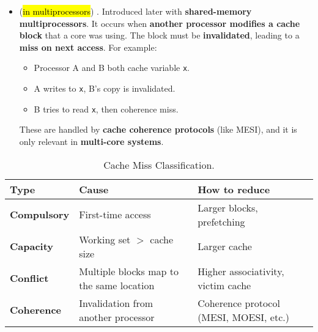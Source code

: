 \begin{itemize}
    \newpage
    
    \item (\hl{in multiprocessors}) . Introduced later with \textbf{shared-memory multiprocessors}. It occurs when \textbf{another processor modifies a cache block} that a core was using. The block must be \textbf{invalidated}, leading to a \textbf{miss on next access}. For example:
    \begin{itemize}
        \item Processor A and B both cache variable \texttt{x}.
        \item A writes to \texttt{x}, B's copy is invalidated.
        \item B tries to read \texttt{x}, then coherence miss.
    \end{itemize}
    These are handled by \textbf{cache coherence protocols} (like MESI), and it is only relevant in \textbf{multi-core systems}.
\end{itemize}

\begin{table}[!htp]
    \centering
    \begin{tabular}{@{} l p{11.5em} p{12em} @{}}
        \toprule
        Type & Cause & How to reduce \\
        \midrule
        \textbf{Compulsory} & First-time access                         & Larger blocks, prefetching                \\ [.5em]
        \textbf{Capacity}   & Working set $>$ cache size                & Larger cache                              \\ [.5em]
        \textbf{Conflict}   & Multiple blocks map to the same location  & Higher associativity, victim cache        \\ [.5em]
        \textbf{Coherence}  & Invalidation from another processor       & Coherence protocol (MESI, MOESI, etc.)    \\
        \bottomrule
    \end{tabular}
    \caption{Cache Miss Classification.}
\end{table}